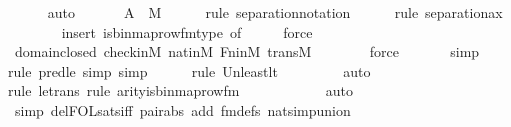\begin{isabellebody}
\ \ \ \ \isamarkupfalse%
\ auto\isanewline
\ \ \isanewline
\ \ \isamarkupfalse%
\ {\isachardoublequoteopen}{\isacharquery}{\kern0pt}A\ {\isasymin}\ M{\isachardoublequoteclose}\ \isanewline
\ \ \ \ \isamarkupfalse%
{\isacharparenleft}{\kern0pt}rule\ separation{\isacharunderscore}{\kern0pt}notation{\isacharparenright}{\kern0pt}\isanewline
\ \ \ \ \ \isamarkupfalse%
{\isacharparenleft}{\kern0pt}rule\ separation{\isacharunderscore}{\kern0pt}ax{\isacharparenright}{\kern0pt}\isanewline
\ \ \ \ \ \ \ \isamarkupfalse%
{\isacharparenleft}{\kern0pt}insert\ is{\isacharunderscore}{\kern0pt}binmap{\isacharunderscore}{\kern0pt}row{\isacharprime}{\kern0pt}{\isacharunderscore}{\kern0pt}fm{\isacharunderscore}{\kern0pt}type\ {\isacharbrackleft}{\kern0pt}of\ {}\ {}\ {}\ {}\ {}{\isacharbrackright}{\kern0pt}{\isacharcomma}{\kern0pt}\ force{\isacharparenright}{\kern0pt}\isanewline
\ \ \ \ \isamarkupfalse%
\ domain{\isacharunderscore}{\kern0pt}closed\ check{\isacharunderscore}{\kern0pt}in{\isacharunderscore}{\kern0pt}M\ nat{\isacharunderscore}{\kern0pt}in{\isacharunderscore}{\kern0pt}M\ Fn{\isacharunderscore}{\kern0pt}in{\isacharunderscore}{\kern0pt}M\ transM\isanewline
\ \ \ \ \ \ \isamarkupfalse%
\ force\isanewline
\ \ \ \ \ \isamarkupfalse%
\ simp\isanewline
\ \ \ \ \isamarkupfalse%
{\isacharparenleft}{\kern0pt}rule\ pred{\isacharunderscore}{\kern0pt}le{\isacharcomma}{\kern0pt}\ simp{\isacharcomma}{\kern0pt}\ simp{\isacharparenright}{\kern0pt}\isanewline
\ \ \ \ \ \isamarkupfalse%
{\isacharparenleft}{\kern0pt}rule\ Un{\isacharunderscore}{\kern0pt}least{\isacharunderscore}{\kern0pt}lt{\isacharparenright}{\kern0pt}{\isacharplus}{\kern0pt}\isanewline
\ \ \ \ \ \ \ \isamarkupfalse%
\ auto{\isacharbrackleft}{\kern0pt}{}{\isacharbrackright}{\kern0pt}\isanewline
\ \ \ \ \ \isamarkupfalse%
{\isacharparenleft}{\kern0pt}rule\ le{\isacharunderscore}{\kern0pt}trans{\isacharcomma}{\kern0pt}\ rule\ arity{\isacharunderscore}{\kern0pt}is{\isacharunderscore}{\kern0pt}binmap{\isacharunderscore}{\kern0pt}row{\isacharprime}{\kern0pt}{\isacharunderscore}{\kern0pt}fm{\isacharparenright}{\kern0pt}\isanewline
\ \ \ \ \ \ \ \ \ \ \isamarkupfalse%
\ auto{\isacharbrackleft}{\kern0pt}{}{\isacharbrackright}{\kern0pt}\isanewline
\ \ \ \ \ \isamarkupfalse%
\ {\isacharparenleft}{\kern0pt}simp\ del{\isacharcolon}{\kern0pt}FOL{\isacharunderscore}{\kern0pt}sats{\isacharunderscore}{\kern0pt}iff\ pair{\isacharunderscore}{\kern0pt}abs\ add{\isacharcolon}{\kern0pt}\ fm{\isacharunderscore}{\kern0pt}defs\ nat{\isacharunderscore}{\kern0pt}simp{\isacharunderscore}{\kern0pt}union{\isacharparenright}{\kern0pt}\isanewline

\end{isabellebody}
